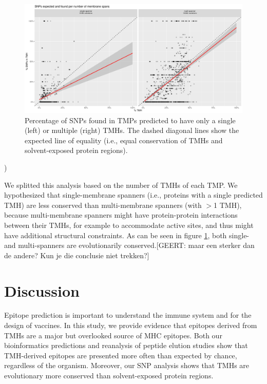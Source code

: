 \begin{figure}[!htbp]
  \includegraphics[width=\textwidth]{ncbi_peregrine_results/fig_f_snps_found_and_expected_per_spanner.png}
  \caption{
    Percentage of SNPs found in TMPs predicted to have only a single (left) or multiple (right) TMHs.
    The dashed diagonal lines show the expected line of equality (i.e., equal conservation of TMHs and solvent-exposed protein regions).
  }
  \label{fig:f_snps_found_and_expected_per_spanner}
\end{figure}
)

We splitted this analysis based on the number of TMHs
of each TMP. 
We hypothesized that single-membrane spanners (i.e., proteins
with a single predicted TMH) are less conserved than multi-membrane spanners (with $>$1 TMH),
because multi-membrane spanners
might have protein-protein interactions between their TMHs, 
for example to accommodate active sites, and 
thus might have additional structural constraints.
As can be seen in figure \ref{fig:f_snps_found_and_expected_per_spanner}, 
both single- and multi-spanners are evolutionarily conserved.[GEERT: maar een sterker dan de andere? Kun je die conclusie niet trekken?]



\section{Discussion}


Epitope prediction is 
important to understand the immune system and for the design of vaccines. In this study, we provide evidence that epitopes
derived from TMHs are a major but overlooked source of MHC epitopes. Both our bioinformatics predictions and reanalysis of peptide elution studies show that TMH-derived epitopes are 
presented more often than expected by chance, regardless of the organism. Moreover, our SNP analysis shows  
that TMHs are evolutionary more conserved than solvent-exposed protein regions.

